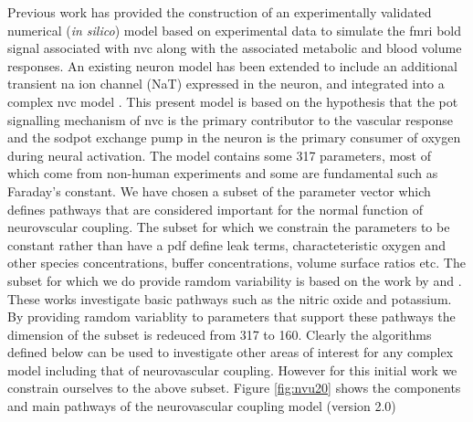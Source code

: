 Previous work \cite{Mathias2018} has provided  the construction of an experimentally validated numerical (\textit{in silico}) model based on experimental data to simulate the \gls{fmri} \gls{bold} signal associated with \gls{nvc} along with the associated metabolic and blood volume responses. An existing neuron model \citep{Mathias2017, Mathias2017a} has been extended to include an additional transient \gls{na} ion channel (NaT) expressed in the neuron, and integrated into a complex \gls{nvc} model \citep{Dormanns2015, Dormanns2016, Kenny2017a}. This present model is based on the hypothesis that the \gls{pot} signalling mechanism of \gls{nvc} is the primary contributor to the vascular response and the \gls{sodpot} exchange pump in the neuron is the primary consumer of oxygen during neural activation. The model contains some 317 parameters, most of which come from non-human experiments and some are fundamental such as Faraday's constant. We have chosen a subset of the parameter vector which defines pathways that are considered important for the normal function of neurovscular coupling. The subset for which we constrain the parameters to be constant rather than have a pdf define leak terms, characteteristic oxygen and other species concentrations, buffer concentrations, volume surface ratios etc. The subset for which we do provide ramdom variability is based on the work by \cite{Dormanns2016} and \cite{Kenny2018}. These works investigate basic pathways such as the nitric oxide and potassium. By providing ramdom variablity to parameters that support these pathways the dimension of the subset is redeuced from 317 to 160. Clearly the algorithms defined below can be used to investigate other areas of interest for any complex model including that of neurovascular coupling. However for this initial work we constrain ourselves to the above subset. 
Figure \ref{fig:nvu20} shows the components and main pathways of the neurovascular coupling model (version 2.0) \\
